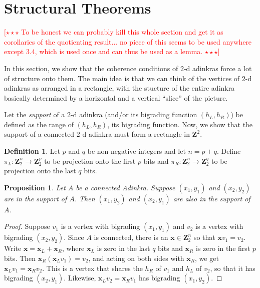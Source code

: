 \documentclass[12pt,twoside,singlespace]{article}
\numberwithin{equation}{section}
\newtheorem{prop}[equation]{Proposition}
\theoremstyle{definition}
\newtheorem{definition}[equation]{Definition}
\newcommand{\ZZ}{\mathbf{Z}}
\newcommand{\com}[1]{\textcolor{red}{$[\star \star \star$ #1 $\star \star \star]$}}
\renewcommand{\vec}[1]{\mathbf{#1}}
\begin{document}
\section{Structural Theorems}
\label{sec:structural}

\com{To be honest we can probably kill this whole section and get it as corollaries of the quotienting result... no piece of this seems to be used anywhere except 3.4, which is used once and can thus be used as a lemma.}

In this section, we show that the coherence conditions of $2$-d adinkras force a lot of structure onto them. The main idea is that we can think of the vertices of $2$-d adinkras as arranged in a rectangle, with the stucture of the entire adinkra basically determined by a horizontal and a vertical ``slice'' of the picture.

Let the \emph{support} of a $2$-d adinkra (and/or its bigrading function $(h_L,h_R)$) be defined as the range of $(h_L,h_R)$, its bigrading function. Now, we show that the support of a connected $2$-d adinkra must form a rectangle in $\ZZ^2$.


\begin{definition}
Let $p$ and $q$ be non-negative integers and let $n=p+q$.  Define $\pi_L:\ZZ_2^n\to\ZZ_2^p$ to be projection onto the first $p$ bits and $\pi_R:\ZZ_2^n\to\ZZ_2^q$ to be projection onto the last $q$ bits.
\end{definition}

\begin{prop}
\label{prop:rectangle-completion}
Let $A$ be a connected Adinkra.  Suppose $(x_1,y_1)$ and $(x_2,y_2)$ are in the support of $A$.  Then $(x_1,y_2)$ and $(x_2,y_1)$ are also in the support of $A$.
\end{prop}
\begin{proof}
Suppose $v_1$ is a vertex with bigrading $(x_1,y_1)$ and $v_2$ is a vertex with bigrading $(x_2,y_2)$.  Since $A$ is connected, there is an $\vec{x}\in\ZZ_2^n$ so that $\vec{x}v_1=v_2$.  Write $\vec{x}=\vec{x}_L+\vec{x}_R$, where $\vec{x}_L$ is zero in the last $q$ bits and $\vec{x}_R$ is zero in the first $p$ bits.  Then $\vec{x}_R(\vec{x}_Lv_1)=v_2$, and acting on both sides with $\vec{x}_R$, we get $\vec{x}_Lv_1=\vec{x}_Rv_2$.  This is a vertex that shares the $h_R$ of $v_1$ and $h_L$ of $v_2$, so that it has bigrading $(x_2,y_1)$.  Likewise, $\vec{x}_L v_2=\vec{x}_R v_1$ has bigrading $(x_1,y_2)$.
\end{proof}
\end{document}
